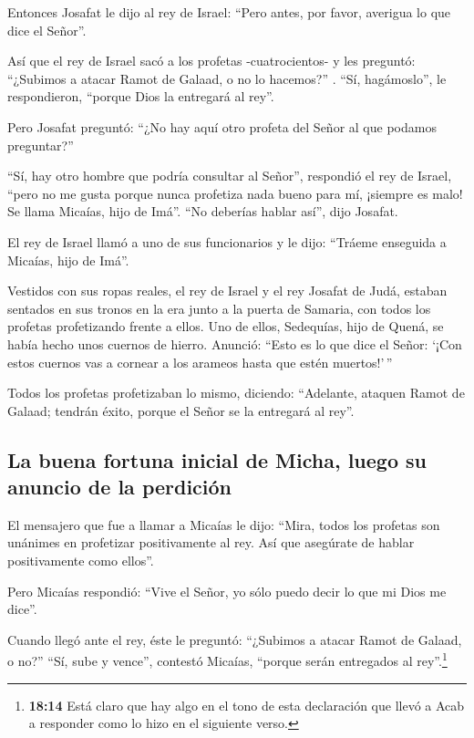  Entonces Josafat le dijo al rey de Israel: ``Pero antes,
por favor, averigua lo que dice el Señor''.

 Así que el rey de Israel sacó a los profetas
-cuatrocientos- y les preguntó: ``¿Subimos a atacar Ramot de Galaad, o
no lo hacemos?'' . ``Sí, hagámoslo'', le respondieron, ``porque Dios la
entregará al rey''.

 Pero Josafat preguntó: ``¿No hay aquí otro profeta del
Señor al que podamos preguntar?''

 ``Sí, hay otro hombre que podría consultar al Señor'',
respondió el rey de Israel, ``pero no me gusta porque nunca profetiza
nada bueno para mí, ¡siempre es malo! Se llama Micaías, hijo de Imá''.
``No deberías hablar así'', dijo Josafat.

 El rey de Israel llamó a uno de sus funcionarios y le
dijo: ``Tráeme enseguida a Micaías, hijo de Imá''.

 Vestidos con sus ropas reales, el rey de Israel y el rey
Josafat de Judá, estaban sentados en sus tronos en la era junto a la
puerta de Samaria, con todos los profetas profetizando frente a ellos.
 Uno de ellos, Sedequías, hijo de Quená, se había hecho
unos cuernos de hierro. Anunció: ``Esto es lo que dice el Señor: `¡Con
estos cuernos vas a cornear a los arameos hasta que estén muertos!'\,''

 Todos los profetas profetizaban lo mismo, diciendo:
``Adelante, ataquen Ramot de Galaad; tendrán éxito, porque el Señor se
la entregará al rey''.

\hypertarget{la-buena-fortuna-inicial-de-micha-luego-su-anuncio-de-la-perdiciuxf3n}{%
\subsection{La buena fortuna inicial de Micha, luego su anuncio de la
perdición}\label{la-buena-fortuna-inicial-de-micha-luego-su-anuncio-de-la-perdiciuxf3n}}

 El mensajero que fue a llamar a Micaías le dijo: ``Mira,
todos los profetas son unánimes en profetizar positivamente al rey. Así
que asegúrate de hablar positivamente como ellos''.

 Pero Micaías respondió: ``Vive el Señor, yo sólo puedo
decir lo que mi Dios me dice''.

 Cuando llegó ante el rey, éste le preguntó: ``¿Subimos a
atacar Ramot de Galaad, o no?'' ``Sí, sube y vence'', contestó Micaías,
``porque serán entregados al rey''.\footnote{\textbf{18:14} Está claro
  que hay algo en el tono de esta declaración que llevó a Acab a
  responder como lo hizo en el siguiente verso.}

